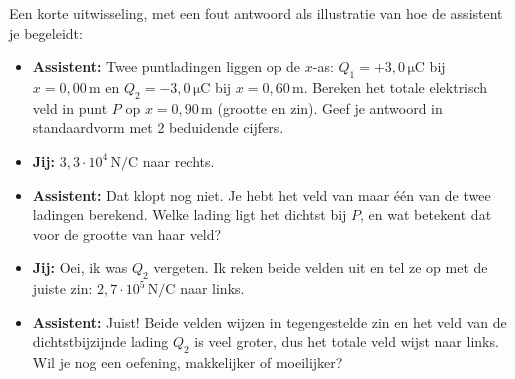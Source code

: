 \documentclass{ximera}
\begin{document}
\begin{example}[foldable=true,title={Zo ziet een gesprek eruit}]\nl
    Een korte uitwisseling, met een fout antwoord als illustratie van hoe de assistent je begeleidt:
    \begin{itemize}
        \item \textbf{Assistent:} Twee puntladingen liggen op de $x$-as: $Q_1 = +3{,}0 \, \mathrm{\mu C}$ bij $x = 0{,}00 \, \mathrm{m}$ en $Q_2 = -3{,}0 \, \mathrm{\mu C}$ bij $x = 0{,}60 \, \mathrm{m}$. Bereken het totale elektrisch veld in punt $P$ op $x = 0{,}90 \, \mathrm{m}$ (grootte en zin). Geef je antwoord in standaardvorm met 2 beduidende cijfers.
        \item \textbf{Jij:} $3{,}3 \cdot 10^{4} \, \mathrm{N/C}$ naar rechts.
        \item \textbf{Assistent:} Dat klopt nog niet. Je hebt het veld van maar één van de twee ladingen berekend. Welke lading ligt het dichtst bij $P$, en wat betekent dat voor de grootte van haar veld?
        \item \textbf{Jij:} Oei, ik was $Q_2$ vergeten. Ik reken beide velden uit en tel ze op met de juiste zin: $2{,}7 \cdot 10^{5} \, \mathrm{N/C}$ naar links.
        \item \textbf{Assistent:} Juist! Beide velden wijzen in tegengestelde zin en het veld van de dichtstbijzijnde lading $Q_2$ is veel groter, dus het totale veld wijst naar links. Wil je nog een oefening, makkelijker of moeilijker?
    \end{itemize}
\end{example}
\end{document}
